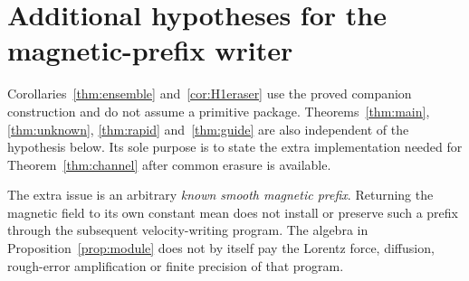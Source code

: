 \documentclass[11pt,a4paper]{amsart}
\theoremstyle{definition}
\theoremstyle{remark}
\numberwithin{equation}{section}
\begin{document}
\section{Additional hypotheses for the magnetic-prefix writer}\label{app:primitive}

Corollaries~\ref{thm:ensemble} and~\ref{cor:H1eraser} use the proved companion construction and do not assume a primitive package. Theorems~\ref{thm:main}, \ref{thm:unknown}, \ref{thm:rapid} and~\ref{thm:guide} are also independent of the hypothesis below. Its sole purpose is to state the extra implementation needed for Theorem~\ref{thm:channel} after common erasure is available.

The extra issue is an arbitrary \emph{known smooth magnetic prefix}. Returning the magnetic field to its own constant mean does not install or preserve such a prefix through the subsequent velocity-writing program. The algebra in Proposition~\ref{prop:module} does not by itself pay the Lorentz force, diffusion, rough-error amplification or finite precision of that program.
\end{document}
